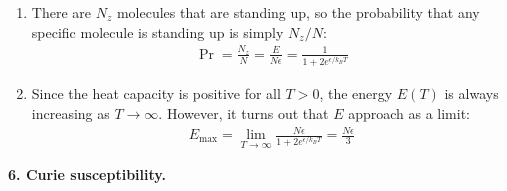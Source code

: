 \documentclass{article}
\theoremstyle{definition}
\newcommand{\f}[2]{\frac{#1}{#2}}
\begin{document}
\begin{enumerate}[label=(\alph*)]
\begin{lstlisting}
	(*Plotting*)
	In[48]:= Plot[x^2*Exp[x]/(1 + 2*Exp[x])^2, {x, 0, 10}, 
	AxesLabel -> {\[Epsilon]/kT, C/(2 kN)}]
	\end{lstlisting}
	
	\item There are $N_z$ molecules that are standing up, so the probability that any specific molecule is standing up is simply $N_z/N$:
	\begin{align*}
	\boxed{\Pr = \f{N_z}{N}  =\f{E}{N\epsilon} = \f{1}{1 + 2e^{\epsilon/k_BT}}}
	\end{align*}
	
	\item Since the heat capacity is positive for all $T>0$, the energy $E(T)$ is always increasing as $T\to \infty$. However, it turns out that $E$ approach as a limit:
	\begin{align*}
	\boxed{E_\text{max} = \lim_{T\to \infty} \f{N\epsilon}{1 + 2e^{\epsilon/k_BT}} = \f{N\epsilon}{3}}
	\end{align*}
\end{enumerate}




\noindent \textbf{6. Curie susceptibility.}
\end{document}
